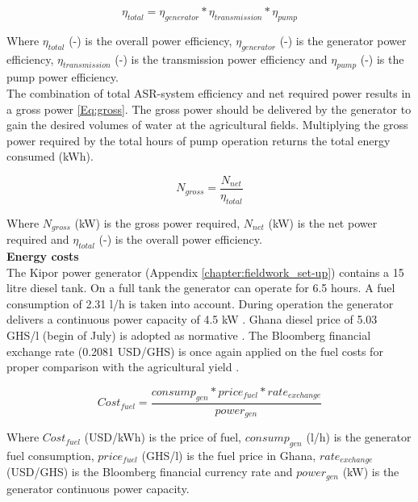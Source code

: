 \begin{equation}
 \eta_{total} =   \eta_{generator} * \eta_{transmission} * \eta_{pump} \end{equation}

Where $\eta_{total}$ (-) is the overall power efficiency, $\eta_{generator}$ (-) is the generator power efficiency, $\eta_{transmission}$ (-) is the transmission power efficiency and $\eta_{pump}$ (-) is the pump power efficiency. \\

The combination of total ASR-system efficiency and net required power results in a gross power \ref{Eq:gross}. The gross power should be delivered by the generator to gain the desired volumes of water at the agricultural fields. Multiplying the gross power required by the total hours of pump operation returns the total energy consumed (kWh).

\begin{equation}
 N_{gross} =   \frac{N_{net}}{\eta_{total}}
\label{Eq:gross}
\end{equation}

Where $N_{gross}$ (kW) is the gross power required, $N_{net}$ (kW) is the net power required and $\eta_{total}$ (-) is the overall power efficiency. \\

\textbf{Energy costs} \\
The Kipor power generator (Appendix \ref{chapter:fieldwork_set-up}) contains a 15 litre diesel tank. On a full tank the generator can operate for 6.5 hours. A fuel consumption of 2.31 l/h is taken into account. During operation the generator delivers a continuous power capacity of 4.5 kW \citep{TS242018}. Ghana diesel price of 5.03 GHS/l (begin of July) is adopted as normative \citep{GlobalPetrolPrices2018}. The Bloomberg financial exchange rate (0.2081 USD/GHS) is once again applied on the fuel costs for proper comparison with the agricultural yield \citep{Bloomberg2018}.

\begin{equation}
 Cost_{fuel} =  \frac{consump_{gen} * price_{fuel} * rate_{exchange}}{power_{gen}}
\end{equation}

Where $Cost_{fuel}$ (USD/kWh) is the price of fuel,  $consump_{gen}$ (l/h) is the generator fuel consumption,  $price_{fuel}$ (GHS/l) is the fuel price in Ghana, $rate_{exchange}$ (USD/GHS) is the Bloomberg financial currency rate and $power_{gen}$ (kW) is the generator continuous power capacity. \\

